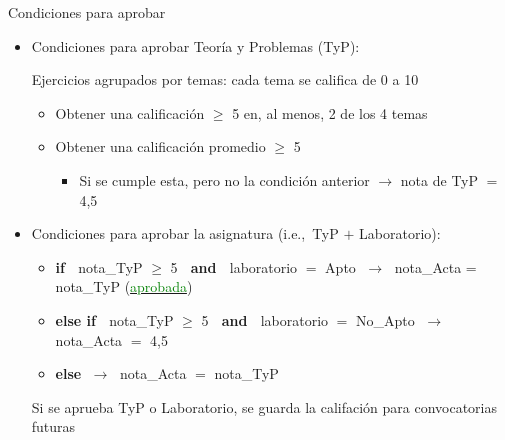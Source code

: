 \documentclass[aspectratio=169, usenames,svgnames,dvipsnames]{beamer}
\begin{document}
\begin{frame}{Condiciones para aprobar}
    \begin{itemize}
    \item \alert{Condiciones para aprobar Teoría y Problemas}  (TyP):

    \vspace{1mm}
    Ejercicios agrupados por temas: cada tema se califica de 0 a 10
        \vspace{1mm}
        \begin{itemize}
        \item {\normalsize Obtener una calificación $\geq$ 5 en, al menos, 2 de los 4 temas}
        \vspace{1mm}
        \item {\normalsize Obtener una calificación promedio $\geq$ 5} 
            \vspace{1mm}
            \begin{itemize}
            \item {\normalsize Si se cumple esta, pero no la condición anterior $\rightarrow$ nota de TyP $=$ 4,5}
            \end{itemize}
        \end{itemize}
    \vspace{3mm}
    \item \alert{Condiciones para aprobar la asignatura} (i.e.,~TyP $+$ Laboratorio):
        \vspace{1mm}
        \begin{itemize}
        \item {\normalsize \textbf{if} $\;$ nota\_TyP $\geq$ 5 $\;$ \textbf{and} $\;$ laboratorio $=$ Apto $\; \rightarrow \;$ nota\_Acta = nota\_TyP} (\underline{\textcolor{green}{aprobada}})
        
        \vspace{1mm}
        \item {\normalsize \textbf{else if} $\;$ nota\_TyP $\geq$ 5 $\;$ \textbf{and} $\;$ laboratorio $=$ No\_Apto $\; \rightarrow \;$ nota\_Acta $=$ 4,5}
        \vspace{1mm}
        \item {\normalsize \textbf{else} $\; \rightarrow \;$ nota\_Acta $=$ nota\_TyP}
        \end{itemize}
    \vspace{6mm}
    Si se aprueba TyP o Laboratorio, \alert{se guarda la califación} para convocatorias futuras
    \end{itemize}

\end{frame}
\end{document}
